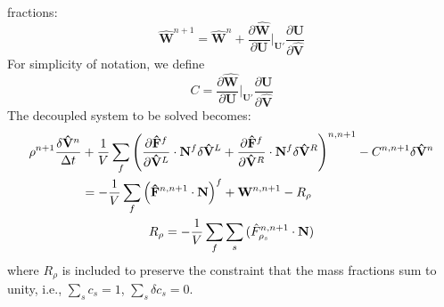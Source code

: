 fractions:
\begin{equation}
  \mathbf{\hat{W}}^{n+1} = \mathbf{\hat{W}}^n+\frac{\partial
  \mathbf{\hat{W}}}{\partial \mathbf{U}}\bigg|_{\mathbf{U}'} \frac{\partial
  \mathbf{U}}{\partial \mathbf{\hat{V}}} 
\end{equation}
For simplicity of notation, we define
\begin{equation}
  C = \frac{\partial \mathbf{\hat{W}}}{\partial
  \mathbf{U}}\bigg|_{\mathbf{U}'} \frac{\partial \mathbf{U}}{\partial
  \mathbf{\hat{V}}}
\end{equation}
The decoupled system to be solved becomes:
\begin{gather} 
  \begin{split}
    \rho^{n+1} \frac{\delta \mathbf{\hat{V}}^n}{\Delta t}
    &+\frac{1}{V}
    \sum\limits_{f}^{}{
     \left(
       \frac{\partial \mathbf{\hat{F}}^f}{\partial \mathbf{\hat{V}}^L} \cdot \mathbf{N}^f \delta \mathbf{\hat{V}}^L
       + \frac{\partial \mathbf{\hat{F}}^f}{\partial \mathbf{\hat{V}}^R} \cdot \mathbf{N}^f \delta \mathbf{\hat{V}}^R
      \right)^{n,n+1}}
     - C^{n,n+1} \delta \mathbf{\hat{V}}^n \\
    &= 
    -\frac{1}{V}\sum\limits_{f}^{}{
      \left( \mathbf{\hat{F}}^{n,n+1} \cdot \mathbf{N} \right)^f
    } + \mathbf{W}^{n, n+1} - R_\rho
  \end{split} \\ 
  R_\rho = -\frac{1}{V}\sum\limits_{f}{\sum\limits_{s}
  {(\hat{F}_{\rho_s}^{n,n+1}\cdot\mathbf{N})}}
  \label{decoupled-no-scaling}
\end{gather}
where $R_\rho$ is included to preserve the constraint that the mass fractions
sum to unity, i.e., $\sum\limits_{s}{c_s}=1$, $\sum\limits_{s}{\delta
c_s}=0$.

